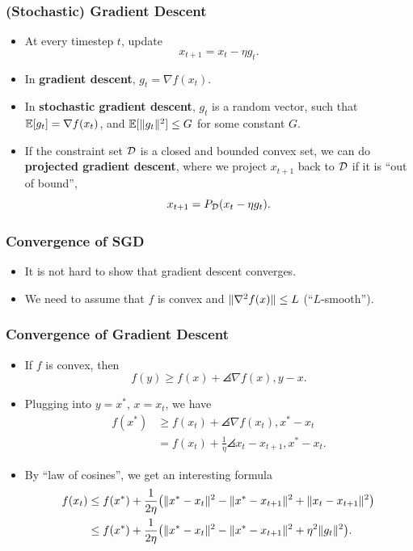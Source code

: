 \documentclass{beamer}
\begin{document}
\begin{frame}
    \frametitle{(Stochastic) Gradient Descent}
    \begin{itemize}
        \item At every timestep $t$, update
        \[
            x_{t+1} = x_t - \eta g_t.
        \]
        \item In \textbf{gradient descent}, $g_t = \nabla f(x_t)$.
        \item In \textbf{stochastic gradient descent}, $g_t$ is a random vector, such that $\operatorname*{\mathbb{E}}[g_t] = \nabla f(x_t)$, and $\operatorname*{\mathbb{E}}[\lVert g_t\rVert^2] \le G$ for some constant $G$.
        \item If the constraint set $\mathcal{D}$ is a closed and bounded convex set, we can do \textbf{projected gradient descent}, where we project $x_{t+1}$ back to $\mathcal{D}$ if it is ``out of bound'',
        \[
            x_{t+1} = P_{\mathcal{D}}(x_t - \eta g_t).
        \]
    \end{itemize}
\end{frame}

\begin{frame}
    \frametitle{Convergence of SGD}
    \begin{itemize}
        \item It is not hard to show that gradient descent converges.
        \item We need to assume that $f$ is convex and $\lVert\nabla^2 f(x)\rVert \le L$ (``$L$-smooth'').
    \end{itemize}
\end{frame}

\begin{frame}
    \frametitle{Convergence of Gradient Descent}
    \begin{itemize}
        \item If $f$ is convex, then
        \[
            f(y) \ge f(x) + \angles{\nabla f(x), y - x}.
        \]
        \item Plugging into $y = x^*$, $x = x_t$, we have
        \begin{align*}
            f(x^*) &\ge f(x_t) + \angles{\nabla f(x_t), x^* - x_t}\\
            &= f(x_t) + \frac{1}{\eta}\angles{x_t - x_{t+1}, x^* - x_t}.
        \end{align*}
        \item By ``law of cosines'', we get an interesting formula
        \begin{align*}
            f(x_t)
            &\le f(x^*) + \frac{1}{2\eta}\parens*{\norm{x^* - x_t}^2 - \norm{x^* - x_{t+1}}^2 + \norm{x_t - x_{t+1}}^2}\\
            &\le f(x^*) + \frac{1}{2\eta}\parens*{\norm{x^* - x_t}^2 - \norm{x^* - x_{t+1}}^2 + \eta^2 \norm{g_t}^2}.
        \end{align*}
    \end{itemize}
\end{frame}
\end{document}
